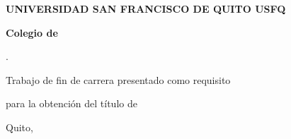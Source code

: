 \thispagestyle{empty}
\begin{center}
{\bfseries\xviii UNIVERSIDAD SAN FRANCISCO DE QUITO USFQ\par}
\blank\blank
{\bfseries\xiv Colegio de \nombreColegio\par}
\blank\blank\blank\blank\blank\blank\blank
{\bfseries\xvi \tituloTrabajo\par}
\blank
{\xps\textcolor{gris}{.}\par}
\blank\blank\blank\blank
{\bfseries\xviii \nombreAutor\par}
\blank
{\bfseries\xvi \nombreCarrera\par}
\blank\blank\blank
{\xiv Trabajo de fin de carrera presentado como requisito\par}
{\xiv para la obtención del título de\par}
{\xiv \tituloObtenido\par}
\blankx\blankx\blankx\blankx\blankx
Quito, \fechaDocumento\par
\end{center}
